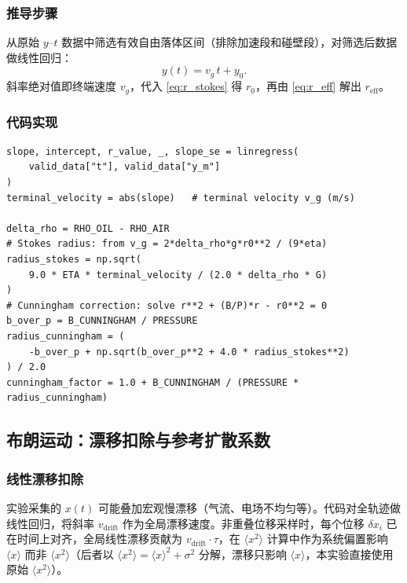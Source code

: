 \documentclass[12pt,a4paper]{ctexart}
\begin{document}
\subsubsection{推导步骤}

从原始 $y$--$t$ 数据中筛选有效自由落体区间（排除加速段和碰壁段），对筛选后数据做线性回归：
\begin{equation}
  y(t) = v_g\,t + y_0.
\end{equation}
斜率绝对值即终端速度 $v_g$，代入 \eqref{eq:r_stokes} 得 $r_0$，再由 \eqref{eq:r_eff} 解出 $r_\text{eff}$。

\subsubsection{代码实现}

\begin{lstlisting}[style=python, caption={自由落体分析核心代码（\texttt{calculate\_freefall}）}]
slope, intercept, r_value, _, slope_se = linregress(
    valid_data["t"], valid_data["y_m"]
)
terminal_velocity = abs(slope)   # terminal velocity v_g (m/s)

delta_rho = RHO_OIL - RHO_AIR
# Stokes radius: from v_g = 2*delta_rho*g*r0**2 / (9*eta)
radius_stokes = np.sqrt(
    9.0 * ETA * terminal_velocity / (2.0 * delta_rho * G)
)
# Cunningham correction: solve r**2 + (B/P)*r - r0**2 = 0
b_over_p = B_CUNNINGHAM / PRESSURE
radius_cunningham = (
    -b_over_p + np.sqrt(b_over_p**2 + 4.0 * radius_stokes**2)
) / 2.0
cunningham_factor = 1.0 + B_CUNNINGHAM / (PRESSURE * radius_cunningham)
\end{lstlisting}

\subsection{布朗运动：漂移扣除与参考扩散系数}

\subsubsection{线性漂移扣除}

实验采集的 $x(t)$ 可能叠加宏观慢漂移（气流、电场不均匀等）。代码对全轨迹做线性回归，将斜率 $v_\text{drift}$ 作为全局漂移速度。非重叠位移采样时，每个位移 $\delta x_i$ 已在时间上对齐，全局线性漂移贡献为 $v_\text{drift}\cdot\tau$，在 $\langle x^2\rangle$ 计算中作为系统偏置影响 $\langle x\rangle$ 而非 $\langle x^2\rangle$（后者以 $\langle x^2\rangle = \langle x\rangle^2 + \sigma^2$ 分解，漂移只影响 $\langle x\rangle$，本实验直接使用原始 $\langle x^2\rangle$）。
\end{document}
